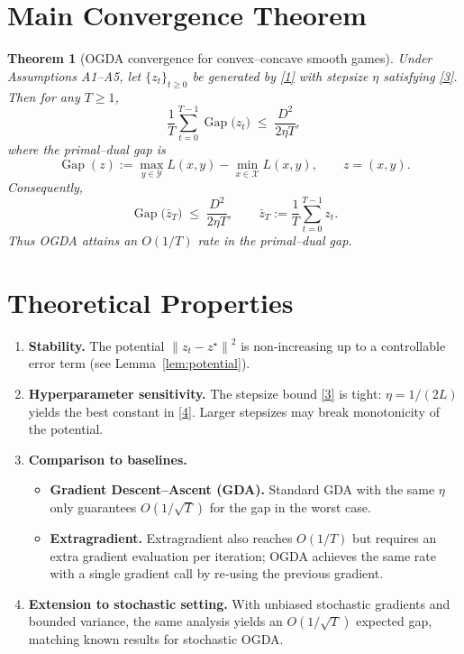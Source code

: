 \documentclass{article}
\newtheorem{theorem}{Theorem}
\newcommand{\norm}[1]{\left\lVert#1\right\rVert}
\newcommand{\gap}{\operatorname{Gap}}
\begin{document}
\section*{Main Convergence Theorem}
\begin{theorem}[OGDA convergence for convex–concave smooth games]\label{thm:ogda}
Under Assumptions A1–A5, let $\{z_t\}_{t\ge0}$ be generated by \eqref{1} with stepsize $\eta$ satisfying \eqref{3}. Then for any $T\ge1$,
\[
\frac{1}{T}\sum_{t=0}^{T-1}\gap\bigl(z_t\bigr)
\;\le\;
\frac{D^{2}}{2\eta T},
\tag{4}
\]
where the primal–dual gap is 
\[
\gap(z):=\max_{y\in\mathcal Y}L(x,y)-\min_{x\in\mathcal X}L(x,y),\qquad
z=(x,y).
\]
Consequently,
\[
\gap\bigl(\bar z_T\bigr)\;\le\;\frac{D^{2}}{2\eta T},
\qquad 
\bar z_T:=\frac{1}{T}\sum_{t=0}^{T-1}z_t .
\]
Thus OGDA attains an $O(1/T)$ rate in the primal–dual gap.
\end{theorem}

\section*{Theoretical Properties}
\begin{enumerate}[label={P\arabic*}.]
\item \textbf{Stability.} The potential $\norm{z_t-z^\star}^2$ is non‑increasing up to a controllable error term (see Lemma~\ref{lem:potential}).
\item \textbf{Hyperparameter sensitivity.} The stepsize bound \eqref{3} is tight: $\eta=1/(2L)$ yields the best constant in \eqref{4}. Larger stepsizes may break monotonicity of the potential.
\item \textbf{Comparison to baselines.}
    \begin{itemize}
        \item \textbf{Gradient Descent–Ascent (GDA).} Standard GDA with the same $\eta$ only guarantees $O(1/\sqrt{T})$ for the gap in the worst case.
        \item \textbf{Extragradient.} Extragradient also reaches $O(1/T)$ but requires an extra gradient evaluation per iteration; OGDA achieves the same rate with a single gradient call by re‑using the previous gradient.
    \end{itemize}
\item \textbf{Extension to stochastic setting.} With unbiased stochastic gradients and bounded variance, the same analysis yields an $O(1/\sqrt{T})$ expected gap, matching known results for stochastic OGDA.
\end{enumerate}
\end{document}
